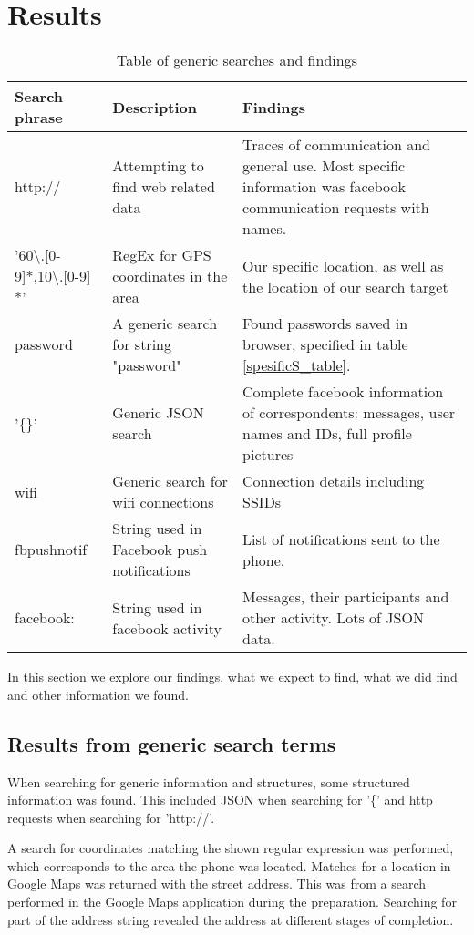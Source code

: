 \section{Results}
\begin{table}[H]
\centering
\begin{tabular}{|m{2cm}|m{2cm}|m{2.5cm}|}
\hline
Search phrase & Description & Findings \\
\hline
http:// & Attempting to find web related data  & Traces of communication and general use. Most specific information was facebook communication requests with names. \\
\hline
'60\textbackslash.[0-9]*,10\textbackslash.[0-9] *' &  RegEx for GPS coordinates in the area & Our specific location, as well as the location of our search target \\
\hline
password & A generic search for string "password" & Found passwords saved in browser, specified in table \ref{spesificS_table}. \\
\hline
'\{\}' & Generic JSON search & Complete facebook information of correspondents: messages, user names and IDs, full profile pictures\\
\hline  
wifi & Generic search for wifi connections & Connection details including SSIDs \\  
\hline
fbpushnotif & String used in Facebook push notifications & List of notifications sent to the phone.\\
\hline
facebook: & String used in facebook activity & Messages, their participants and other activity. Lots of JSON data.\\
\hline
\end{tabular}
\caption{Table of generic searches and findings}
\label{genericS_table}
\end{table}

In this section we explore our findings, what we expect to find, what we did find and other information we found. 

\subsection{Results from generic search terms}
When searching for generic information and structures, some structured information was found. This included JSON when searching for '\{' and http requests when searching for 'http://'.

A search for coordinates matching the shown regular expression was performed, which corresponds to the area the phone was located. Matches for a location in Google Maps was returned with the street address. This was from a search performed in the Google Maps application during the preparation. Searching for part of the address string revealed the address at different stages of completion.

